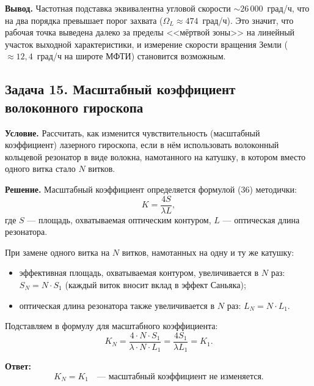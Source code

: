 \documentclass[12pt, a4paper]{article}
\begin{document}
\textbf{Вывод.} Частотная подставка эквивалентна угловой скорости $\sim 26\,000$~град/ч, что на два порядка превышает порог захвата ($\Omega_L \approx 474$~град/ч). Это значит, что рабочая точка выведена далеко за пределы <<мёртвой зоны>> на линейный участок выходной характеристики, и измерение скорости вращения Земли ($\approx 12{,}4$~град/ч на широте МФТИ) становится возможным.


\subsection*{Задача 15. Масштабный коэффициент волоконного гироскопа}

\textbf{Условие.} Рассчитать, как изменится чувствительность (масштабный коэффициент) лазерного гироскопа, если в нём использовать волоконный кольцевой резонатор в виде волокна, намотанного на катушку, в котором вместо одного витка стало $N$ витков.

\textbf{Решение.} Масштабный коэффициент определяется формулой (36) методички:
\begin{equation}
    K = \frac{4S}{\lambda L},
\end{equation}
где $S$ --- площадь, охватываемая оптическим контуром, $L$ --- оптическая длина резонатора.

При замене одного витка на $N$ витков, намотанных на одну и ту же катушку:
\begin{itemize}[leftmargin=1.5em]
    \item эффективная площадь, охватываемая контуром, увеличивается в $N$ раз: $S_N = N \cdot S_1$ (каждый виток вносит вклад в эффект Саньяка);
    \item оптическая длина резонатора также увеличивается в $N$ раз: $L_N = N \cdot L_1$.
\end{itemize}

Подставляем в формулу для масштабного коэффициента:
\begin{equation}
    K_N = \frac{4 \cdot N \cdot S_1}{\lambda \cdot N \cdot L_1} = \frac{4S_1}{\lambda L_1} = K_1.
\end{equation}

\textbf{Ответ:}
\[
    \boxed{K_N = K_1 \quad \text{--- масштабный коэффициент не изменяется.}}
\]


\end{document}
